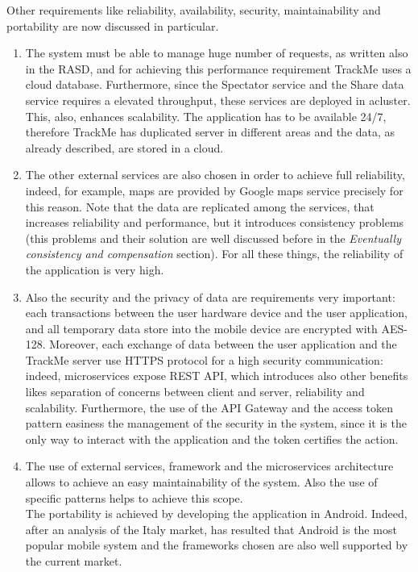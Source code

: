 Other requirements like reliability, availability, security, maintainability and portability are now discussed in particular. \\
\begin{enumerate}
\item The system must be able to manage huge number of requests, as written also in the RASD, and for achieving this performance requirement TrackMe
uses a cloud database. 
Furthermore, since the Spectator service and the Share data service requires a elevated throughput, these services are deployed in acluster.
This, also, enhances scalability.
The application has to be available 24/7, therefore TrackMe has duplicated server in different areas and the data, as already described, are
stored in a cloud. 
\item The other external services are also chosen in order to achieve full reliability, indeed, for example, maps are provided by Google maps
service precisely for this reason. 
Note that the data are replicated among the services, that increases reliability and performance, but it introduces consistency problems
(this problems and their solution are well discussed before in the \textit{Eventually consistency and compensation } section).
For all these things, the reliability of the application is very high.
\item Also the security and the privacy of data are requirements very
important: each transactions between the user hardware device and the user application, and all temporary data store into the mobile device
are encrypted with AES-128. Moreover, each exchange of data between the user application and the TrackMe server use HTTPS protocol for a high
security communication: indeed, microservices expose REST API, which introduces also other benefits likes separation of concerns between
client and server, reliability and scalability. 
Furthermore, the use of the API Gateway and the access token pattern easiness the management of the security in the system, since it is the
only way to interact with the application and the token certifies the action.
\item The use of external services, framework and the microservices architecture allows to achieve an easy maintainability of the system. 
Also the use of specific patterns helps to achieve this scope.\\
The portability is achieved by developing the application in Android. 
Indeed, after an analysis of the Italy market, has resulted that Android is the most popular mobile system and the frameworks chosen are also
well supported by the current market.
\end{enumerate}
